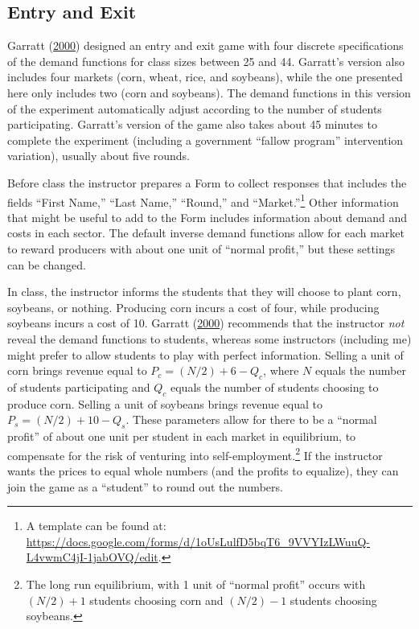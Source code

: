\documentclass[
]{article}
\begin{document}
\hypertarget{entry-and-exit}{%
\subsection{Entry and Exit}\label{entry-and-exit}}

Garratt (\protect\hyperlink{ref-garratt_free_2000}{2000}) designed an
entry and exit game with four discrete specifications of the demand
functions for class sizes between 25 and 44. Garratt's version also
includes four markets (corn, wheat, rice, and soybeans), while the one
presented here only includes two (corn and soybeans). The demand
functions in this version of the experiment automatically adjust
according to the number of students participating. Garratt's version of
the game also takes about 45 minutes to complete the experiment
(including a government ``fallow program'' intervention variation),
usually about five rounds.

Before class the instructor prepares a Form to collect responses that
includes the fields ``First Name,'' ``Last Name,'' ``Round,'' and
``Market.''\footnote{A template can be found at:\\
  \url{https://docs.google.com/forms/d/1oUsLulfD5bqT6_9VVYIzLWuuQ-L4vwmC4jI-1jabOVQ/edit}.}
Other information that might be useful to add to the Form includes
information about demand and costs in each sector. The default inverse
demand functions allow for each market to reward producers with about
one unit of ``normal profit,'' but these settings can be changed.

In class, the instructor informs the students that they will choose to
plant corn, soybeans, or nothing. Producing corn incurs a cost of four,
while producing soybeans incurs a cost of 10. Garratt
(\protect\hyperlink{ref-garratt_free_2000}{2000}) recommends that the
instructor \emph{not} reveal the demand functions to students, whereas
some instructors (including me) might prefer to allow students to play
with perfect information. Selling a unit of corn brings revenue equal to
\(P_c = (N/2) + 6 - Q_c\), where \(N\) equals the number of students
participating and \(Q_c\) equals the number of students choosing to
produce corn. Selling a unit of soybeans brings revenue equal to
\(P_s = (N/2) + 10 - Q_s\). These parameters allow for there to be a
``normal profit'' of about one unit per student in each market in
equilibrium, to compensate for the risk of venturing into
self-employment.\footnote{The long run equilibrium, with 1 unit of
  ``normal profit'' occurs with \((N/2) + 1\) students choosing corn and
  \((N/2) - 1\) students choosing soybeans.} If the instructor wants the
prices to equal whole numbers (and the profits to equalize), they can
join the game as a ``student'' to round out the numbers.
\end{document}
